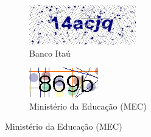\begin{figure}[ht]
	\vspace{.05\linewidth}
	\begin{subfigure}[t]{.475\textwidth}
		\centering
		\includegraphics[width=.9\linewidth, height=.4\linewidth]{figuras/captcha_itau.jpeg}
		\caption{Banco Itaú}
	\end{subfigure}
	\hspace{.05\textwidth}
	\begin{subfigure}[t]{.475\textwidth}
		\centering
		\includegraphics[width=.9\linewidth, height=.4\linewidth]{figuras/captcha_mec.png}
		\caption{ Ministério da Educação (MEC)}
	\end{subfigure}%
	

\end{figure}

